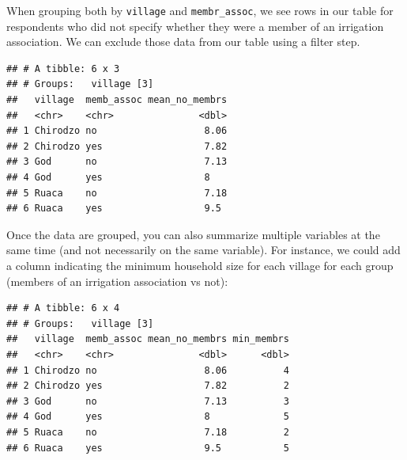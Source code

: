 \documentclass[]{book}
\newenvironment{Shaded}{\begin{snugshade}}{\end{snugshade}}
\newcommand{\KeywordTok}[1]{\textcolor[rgb]{0.13,0.29,0.53}{\textbf{#1}}}
\newcommand{\DataTypeTok}[1]{\textcolor[rgb]{0.13,0.29,0.53}{#1}}
\newcommand{\StringTok}[1]{\textcolor[rgb]{0.31,0.60,0.02}{#1}}
\newcommand{\OperatorTok}[1]{\textcolor[rgb]{0.81,0.36,0.00}{\textbf{#1}}}
\newcommand{\NormalTok}[1]{#1}
\begin{document}
When grouping both by \texttt{village} and \texttt{membr\_assoc}, we see
rows in our table for respondents who did not specify whether they were
a member of an irrigation association. We can exclude those data from
our table using a filter step.

\begin{Shaded}
\end{Shaded}

\begin{verbatim}
## # A tibble: 6 x 3
## # Groups:   village [3]
##   village  memb_assoc mean_no_membrs
##   <chr>    <chr>               <dbl>
## 1 Chirodzo no                   8.06
## 2 Chirodzo yes                  7.82
## 3 God      no                   7.13
## 4 God      yes                  8   
## 5 Ruaca    no                   7.18
## 6 Ruaca    yes                  9.5
\end{verbatim}

Once the data are grouped, you can also summarize multiple variables at
the same time (and not necessarily on the same variable). For instance,
we could add a column indicating the minimum household size for each
village for each group (members of an irrigation association vs not):

\begin{Shaded}
\end{Shaded}

\begin{verbatim}
## # A tibble: 6 x 4
## # Groups:   village [3]
##   village  memb_assoc mean_no_membrs min_membrs
##   <chr>    <chr>               <dbl>      <dbl>
## 1 Chirodzo no                   8.06          4
## 2 Chirodzo yes                  7.82          2
## 3 God      no                   7.13          3
## 4 God      yes                  8             5
## 5 Ruaca    no                   7.18          2
## 6 Ruaca    yes                  9.5           5
\end{verbatim}
\end{document}
